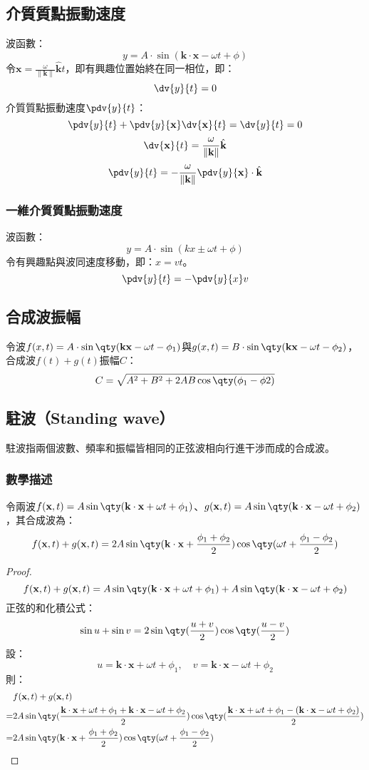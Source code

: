 \documentclass[a4paper,12pt]{report}
\begin{document}
\subsection{介質質點振動速度}
波函數：
\[y=A\cdot\sin(\mathbf{k}\cdot\mathbf{x}-\omega t+\phi)\]
令$\mathbf{x}=\frac{\omega}{\|\mathbf{k}\|}\hat{\mathbf{k}}t$，即有興趣位置始終在同一相位，即：
\[\dv{y}{t}=0\]
介質質點振動速度$\pdv{y}{t}$：
\[\pdv{y}{t}+\pdv{y}{\mathbf{x}}\dv{\mathbf{x}}{t}=\dv{y}{t}=0\]
\[\dv{\mathbf{x}}{t}=\frac{\omega}{\|\mathbf{k}\|}\hat{\mathbf{k}}\]
\[\pdv{y}{t}=-\frac{\omega}{\|\mathbf{k}\|}\pdv{y}{\mathbf{x}}\cdot\hat{\mathbf{k}}\]
\subsubsection{一維介質質點振動速度}
波函數：
\[y=A\cdot\sin(kx\pm\omega t+\phi)\]
令有興趣點與波同速度移動，即：$x=vt$。
\[ \pdv{y}{t}=-\pdv{y}{x}v \]
\subsection{合成波振幅}
令波$f(x,t)=A\cdot\sin\qty(\mathbf{k}\mathbf{x}-\omega t-\phi_1)$與$g(x,t)=B\cdot\sin\qty(\mathbf{k}\mathbf{x}-\omega t-\phi_2)$，合成波$f(t)+g(t)$振幅$C$：
\[ C = \sqrt{A^2+B^2+2AB\cos\qty(\phi_1-\phi2)} \]
\subsection{駐波（Standing wave）}
駐波指兩個波數、頻率和振幅皆相同的正弦波相向行進干涉而成的合成波。
\subsubsection{數學描述}
令兩波$f(\mathbf{x},t)=A\sin\qty(\mathbf{k}\cdot\mathbf{x}+\omega t+\phi_1)$、$g(\mathbf{x},t)=A\sin\qty(\mathbf{k}\cdot\mathbf{x}-\omega t+\phi_2)$，其合成波為：
\[ f(\mathbf{x},t)+g(\mathbf{x},t) = 2A\sin\qty(\mathbf{k}\cdot\mathbf{x} + \frac{\phi_1 + \phi_2}{2})\cos\qty(\omega t + \frac{\phi_1 - \phi_2}{2}) \]
\begin{proof}
\[
f(\mathbf{x},t) + g(\mathbf{x},t) = A\sin\qty(\mathbf{k}\cdot\mathbf{x} + \omega t + \phi_1) + A\sin\qty(\mathbf{k}\cdot\mathbf{x} - \omega t + \phi_2)
\]
正弦的和化積公式：
\[
\sin{u} + \sin{v} = 2\sin\qty(\frac{u + v}{2})\cos\qty(\frac{u - v}{2})
\]
設：
\[
u = \mathbf{k}\cdot\mathbf{x} + \omega t + \phi_1, \quad v = \mathbf{k}\cdot\mathbf{x} - \omega t + \phi_2
\]
則：
\[\begin{aligned}
&f(\mathbf{x},t) + g(\mathbf{x},t) \\
=& 2A\sin\qty(\frac{\mathbf{k}\cdot\mathbf{x} + \omega t + \phi_1 + \mathbf{k}\cdot\mathbf{x} - \omega t + \phi_2}{2})\cos\qty(\frac{\mathbf{k}\cdot\mathbf{x} + \omega t + \phi_1 - (\mathbf{k}\cdot\mathbf{x} - \omega t + \phi_2)}{2})\\
=& 2A\sin\qty(\mathbf{k}\cdot\mathbf{x} + \frac{\phi_1 + \phi_2}{2})\cos\qty(\omega t + \frac{\phi_1 - \phi_2}{2})
\end{aligned}\]
\end{proof}
\end{document}
